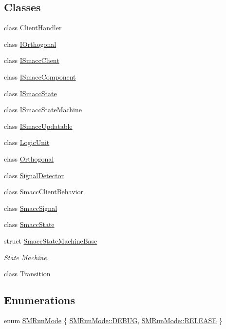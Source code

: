 \subsection*{Classes}
\begin{DoxyCompactItemize}
\item 
class \hyperlink{classsmacc_1_1ClientHandler}{Client\+Handler}
\item 
class \hyperlink{classsmacc_1_1IOrthogonal}{I\+Orthogonal}
\item 
class \hyperlink{classsmacc_1_1ISmaccClient}{I\+Smacc\+Client}
\item 
class \hyperlink{classsmacc_1_1ISmaccComponent}{I\+Smacc\+Component}
\item 
class \hyperlink{classsmacc_1_1ISmaccState}{I\+Smacc\+State}
\item 
class \hyperlink{classsmacc_1_1ISmaccStateMachine}{I\+Smacc\+State\+Machine}
\item 
class \hyperlink{classsmacc_1_1ISmaccUpdatable}{I\+Smacc\+Updatable}
\item 
class \hyperlink{classsmacc_1_1LogicUnit}{Logic\+Unit}
\item 
class \hyperlink{classsmacc_1_1Orthogonal}{Orthogonal}
\item 
class \hyperlink{classsmacc_1_1SignalDetector}{Signal\+Detector}
\item 
class \hyperlink{classsmacc_1_1SmaccClientBehavior}{Smacc\+Client\+Behavior}
\item 
class \hyperlink{classsmacc_1_1SmaccSignal}{Smacc\+Signal}
\item 
class \hyperlink{classsmacc_1_1SmaccState}{Smacc\+State}
\item 
struct \hyperlink{structsmacc_1_1SmaccStateMachineBase}{Smacc\+State\+Machine\+Base}
\begin{DoxyCompactList}\small\item\em State Machine. \end{DoxyCompactList}\item 
class \hyperlink{classsmacc_1_1Transition}{Transition}
\end{DoxyCompactItemize}
\subsection*{Enumerations}
\begin{DoxyCompactItemize}
\item 
enum \hyperlink{namespacesmacc_a3e4f79486ea6ea6342dd3c712d16a4f6}{S\+M\+Run\+Mode} \{ \hyperlink{namespacesmacc_a3e4f79486ea6ea6342dd3c712d16a4f6adc30ec20708ef7b0f641ef78b7880a15}{S\+M\+Run\+Mode\+::\+D\+E\+B\+UG}, 
\hyperlink{namespacesmacc_a3e4f79486ea6ea6342dd3c712d16a4f6a7d649ef069df9885e382417c79f3d5cd}{S\+M\+Run\+Mode\+::\+R\+E\+L\+E\+A\+SE}
 \}
\end{DoxyCompactItemize}
